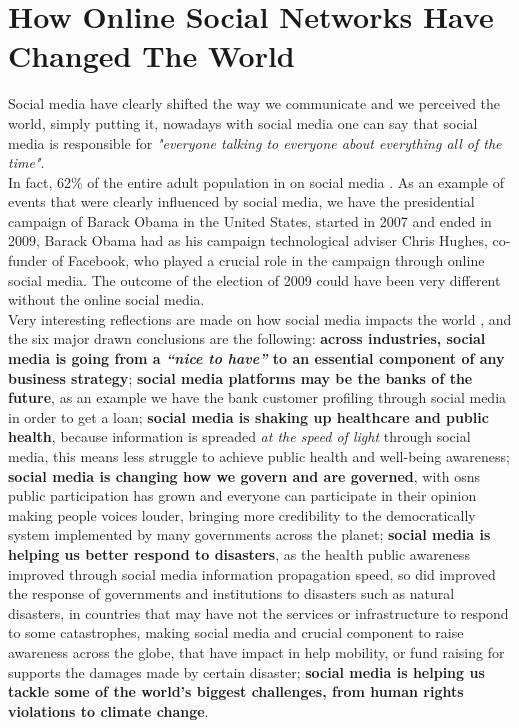 \section{How Online Social Networks Have Changed The World}

Social media have clearly shifted the way we communicate and we perceived the world, simply putting it, nowadays with social media one can say that social media is responsible for \textit{"everyone talking to everyone about everything all of the time"}.\\
\indent In fact, 62\% of the entire adult population in on social media \citep{demogsmu}. As an example of events that were clearly influenced by social media, we have the presidential campaign of Barack Obama in the United States, started in 2007 and ended in 2009, Barack Obama had as his campaign technological adviser Chris Hughes, co-funder of Facebook, who played a crucial role in the campaign through online social media. The outcome of the election of 2009 could have been very different without the online social media.\\
\indent Very interesting reflections are made on how social media impacts the world \citep{6wayschange}, and the six major drawn conclusions are the following: \textbf{across industries, social media is going from a \textit{“nice to have”} to an essential component of any business strategy}; \textbf{social media platforms may be the banks of the future}, as an example we have the bank customer profiling through social media in order to get a loan; \textbf{social media is shaking up healthcare and public health}, because information is spreaded \textit{at the speed of light} through social media, this means less struggle to achieve public health  and well-being awareness; \textbf{social media is changing how we govern and are governed}, with \glspl{osn} public participation has grown and everyone can participate in their opinion making people voices louder, bringing more credibility to the democratically system implemented by many governments across the planet; \textbf{social media is helping us better respond to disasters}, as the health public awareness improved through social media information propagation speed, so did improved the response of governments and institutions to disasters such as natural disasters, in countries that may have not the services or infrastructure to respond to some catastrophes, making social media and crucial component to raise awareness across the globe, that have impact in help mobility, or fund raising for supports the damages made by certain disaster; \textbf{social media is helping us tackle some of the world’s biggest challenges, from human rights violations to climate change}.\\

